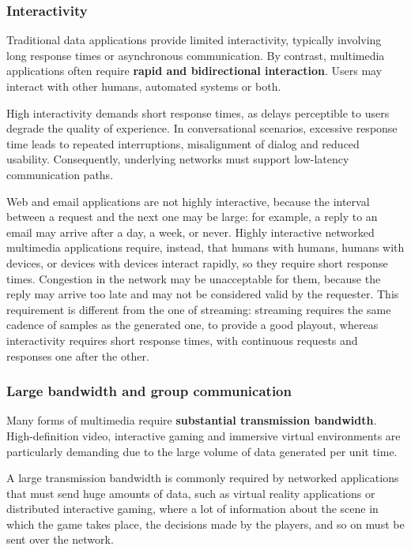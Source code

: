 \subsubsection*{Interactivity}

Traditional data applications provide limited interactivity, typically involving long response times or asynchronous communication. By contrast, multimedia applications often require \textbf{rapid and bidirectional interaction}. Users may interact with other humans, automated systems or both.

High interactivity demands short response times, as delays perceptible to users degrade the quality of experience. In conversational scenarios, excessive response time leads to repeated interruptions, misalignment of dialog and reduced usability. Consequently, underlying networks must support low-latency communication paths.

Web and email applications are not highly interactive, because the interval between a request and the next one may be large: for example, a reply to an email may arrive after a day, a week, or never. Highly interactive networked multimedia applications require, instead, that humans with humans, humans with devices, or devices with devices interact rapidly, so they require short response times. Congestion in the network may be unacceptable for them, because the reply may arrive too late and may not be considered valid by the requester. This requirement is different from the one of streaming: streaming requires the same cadence of samples as the generated one, to provide a good playout, whereas interactivity requires short response times, with continuous requests and responses one after the other.

\subsubsection*{Large bandwidth and group communication}

Many forms of multimedia require \textbf{substantial transmission bandwidth}. High-definition video, interactive gaming and immersive virtual environments are particularly demanding due to the large volume of data generated per unit time.

A large transmission bandwidth is commonly required by networked applications that must send huge amounts of data, such as virtual reality applications or distributed interactive gaming, where a lot of information about the scene in which the game takes place, the decisions made by the players, and so on must be sent over the network.

